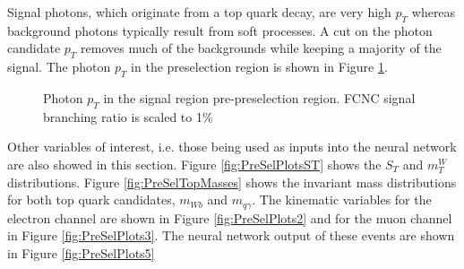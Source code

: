 Signal photons, which originate from a top quark decay, are very high $p_T$ whereas background photons typically result from soft processes.  A cut on the photon candidate $p_T$ removes much of the backgrounds while keeping a majority of the signal.  The photon $p_T$ in the preselection region is shown in Figure \ref{fig:PreSelPlots1}.  
\begin{figure}[h!]
\centering
{}\hfil
{}
\caption{Photon $p_T$ in the signal region pre-preselection region.  FCNC signal branching ratio is scaled to 1\%}
\label{fig:PreSelPlots1}
\end{figure}

Other variables of interest, i.e. those being used as inputs into the neural network are also showed in this section.  Figure \ref{fig:PreSelPlotsST} shows the $S_T$ and $m_T^W$ distributions.  Figure \ref{fig:PreSelTopMasses} shows the invariant mass distributions for both top quark candidates, $m_{Wb}$ and $m_{q\gamma}$.  The kinematic variables for the electron channel are shown in Figure \ref{fig:PreSelPlots2} and for the muon channel in Figure \ref{fig:PreSelPlots3}.  The neural network output of these events are shown in Figure \ref{fig:PreSelPlots5}

